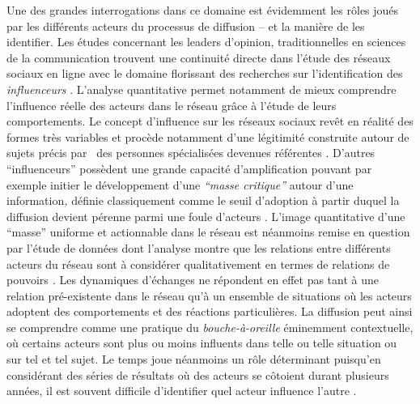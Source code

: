 Une des grandes interrogations dans ce domaine est \'evidemment les
r\^oles jou\'es par les diff\'erents acteurs du processus de diffusion
-- et la mani\`ere de les identifier. Les \'etudes concernant les
leaders d{\textquoteright}opinion, traditionnelles en sciences de la
communication \citep{Katz1955} trouvent une continuit\'e
directe dans l{\textquoteright}\'etude des r\'eseaux sociaux en ligne
avec le domaine florissant des recherches sur
l{\textquoteright}identification des \textit{influenceurs} \citep{Bakshy2011, Leavitt2009}. L{\textquoteright}analyse quantitative permet notamment de mieux
comprendre l{\textquoteright}influence r\'eelle des acteurs dans le
r\'eseau gr\^ace \`a l{\textquoteright}\'etude de leurs comportements.
Le concept d{\textquoteright}influence sur les r\'eseaux sociaux
rev\^et en r\'ealit\'e des formes tr\`es variables et proc\`ede
notamment d{\textquoteright}une l\'egitimit\'e construite autour de
sujets pr\'ecis par \ des personnes sp\'ecialis\'ees devenues
r\'ef\'erentes \citep{Cha2010}. D{\textquoteright}autres
{\textquotedblleft}influenceurs{\textquotedblright} poss\`edent une
grande capacit\'e d{\textquoteright}amplification pouvant par exemple
initier le d\'eveloppement d{\textquoteright}une
\textit{{\textquotedblleft}masse critique{\textquotedblright} }autour
d{\textquoteright}une information\textit{, }d\'efinie classiquement
comme le seuil d{\textquoteright}adoption \`a partir duquel la
diffusion devient p\'erenne parmi une foule d{\textquoteright}acteurs
\citep{Oliver2001}. L{\textquoteright}image quantitative
d{\textquoteright}une {\textquotedblleft}masse{\textquotedblright}
uniforme et actionnable dans le r\'eseau est n\'eanmoins remise en
question par l{\textquoteright}\'etude de donn\'ees dont
l{\textquoteright}analyse montre que les relations entre diff\'erents
acteurs du r\'eseau sont \`a consid\'erer qualitativement en termes de
relations de pouvoirs \citep{Steyer2006}\textit{. }Les dynamiques
d{\textquoteright}\'echanges ne r\'epondent en effet pas tant \`a une
relation pr\'e-existente dans le r\'eseau qu{\textquoteright}\`a un
ensemble de situations o\`u les acteurs adoptent des comportements et
des r\'eactions particuli\`eres. La diffusion peut ainsi se comprendre
comme une pratique du \textit{bouche-\`a-oreille} \'eminemment
contextuelle, o\`u certains acteurs sont plus ou moins influents dans
telle ou telle situation ou sur tel et tel sujet. Le temps joue
n\'eanmoins un r\^ole d\'eterminant puisqu{\textquoteright}en
consid\'erant des s\'eries de r\'esultats o\`u des acteurs se
c\^otoient durant plusieurs ann\'ees, il est souvent difficile
d{\textquoteright}identifier quel acteur influence
l{\textquoteright}autre \citep{Aral2009}. 

